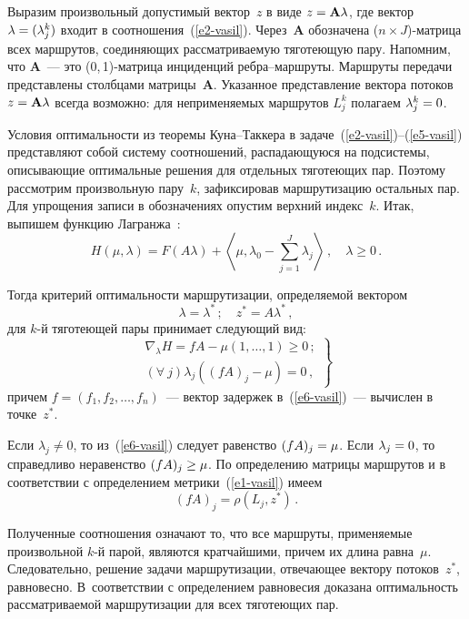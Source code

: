 \begin{multicols}{2}
  Выразим произвольный допустимый вектор~$z$ в виде 
$z\hm=\mathbf{A}\lambda$, где вектор $\lambda\hm=(\lambda_j^k)$ входит в 
соотношения~(\ref{e2-vasil}). Через~$\mathbf{A}$ обозначена 
  ($n\times J$)-мат\-ри\-ца всех маршрутов, соединяющих рассматриваемую 
тяготеющую пару. Напомним, что $\mathbf{A}$~--- это (0,\,1)-мат\-ри\-ца 
инциденций реб\-ра--марш\-ру\-ты. Маршруты передачи представлены столбцами 
матрицы~$\mathbf{A}$. Указанное представление вектора потоков $z\hm= 
\mathbf{A}\lambda$ всегда возможно: для неприменяемых маршрутов $L_j^k$ 
полагаем $\lambda_j^k\hm=0$. 
  
  Условия оптимальности из теоремы Ку\-на--Так\-ке\-ра в 
  задаче~(\ref{e2-vasil})--(\ref{e5-vasil}) представляют собой систему соотношений, 
распадающуюся на подсистемы, описывающие оптимальные решения для 
отдельных тяготеющих пар. Поэтому рассмотрим произвольную пару~$k$, 
зафиксировав маршрутизацию остальных пар. Для упрощения записи в 
обозначениях опустим верхний индекс~$k$. Итак, выпишем функцию 
Лагранжа~\cite{11-vasil, 12-vasil}:
  $$
  H(\mu, \lambda) =F(A\lambda)+\left\langle \mu,\lambda_0 -\sum\limits_{j=1}^J 
\lambda_j \right\rangle\,,\quad \lambda\geq 0\,.
  $$
  
  Тогда критерий оптимальности маршрутизации, определяемой вектором
  $$
  \lambda=\lambda^*\,;\quad z^*=A\lambda^*\,,
  $$
для $k$-й тяготеющей пары принимает следующий вид:
\begin{equation}
\left.
\begin{array}{c}
\nabla_\lambda H= fA -\mu (1, \ldots , 1) \geq 0\,;\\[9pt]
(\forall \ j) \lambda_j ((fA)_j-\mu)=0\,,
\end{array}
\right\}
\label{e6-vasil}
\end{equation} 
причем $f=(f_1, f_2, \ldots , f_n)$~--- вектор задержек в~(\ref{e6-vasil})~--- 
вычислен в точке~$z^*$. 

  Если $\lambda_j\not= 0$, то из~(\ref{e6-vasil}) следует равенство $(fA)_j\hm=\mu$. 
Если $\lambda_j\hm=0$, то справедливо неравенство $(fA)_j\hm\geq \mu$. По 
определению матрицы маршрутов и в соответствии с определением 
метрики~(\ref{e1-vasil}) имеем
  $$
  (fA)_j =\rho (L_j, z^*)\,.
  $$
  
  Полученные соотношения означают то, что все маршруты, применяемые 
произвольной $k$-й парой, являются кратчайшими, причем их длина равна~$\mu$. 
Следовательно, решение задачи маршрутизации, отвечающее вектору 
потоков~$z^*$, равновесно. В~соответствии с определением равновесия доказана 
оптимальность рассматриваемой маршрутизации для всех тяготеющих пар.
  

\end{multicols}
